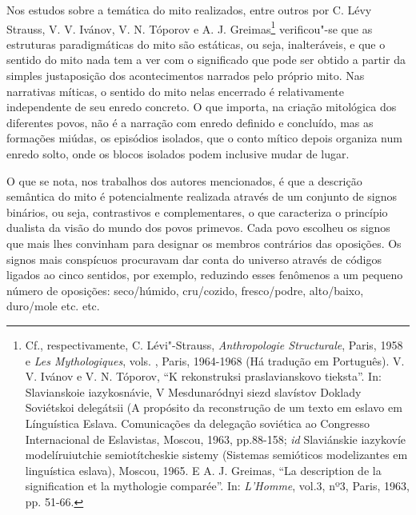 Nos estudos sobre a temática do mito realizados, entre outros por C.
Lévy Strauss, V. V. Ivánov, V. N. Tóporov e A. J. Greimas\footnote{Cf.,
  respectivamente, C. Lévi"-Strauss, \emph{Anthropologie Structurale}, Paris,
  1958 e \emph{Les Mythologiques}, vols. , Paris, 1964-1968 (Há tradução
  em Português). V. V. Ivánov e V. N. Tóporov, ``K rekonstruksi
  praslavianskovo tieksta''. In: Slavianskoie iazykosnávie, V
  Mesdunaródnyi siezd slavístov Doklady Soviétskoi delegátsii (A
  propósito da reconstrução de um texto em eslavo em Línguística Eslava.
  Comunicações da delegação soviética ao  Congresso Internacional de
  Eslavistas, Moscou, 1963, pp.88-158; \emph{id} Slaviánskie iazykovíe
  modelíruiutchie semiotítcheskie sistemy (Sistemas semióticos
  modelizantes em linguística eslava), Moscou, 1965. E A. J. Greimas,
  ``La description de la signification et la mythologie
  comparée''. In: \emph{L'Homme}, vol.3, nº3, Paris, 1963, pp. 51-66.}
verificou"-se que as estruturas paradigmáticas do mito são estáticas, ou
seja, inalteráveis, e que o sentido do mito nada tem a ver com o
significado que pode ser obtido a partir da simples justaposição dos
acontecimentos narrados pelo próprio mito. Nas narrativas míticas, o
sentido do mito nelas encerrado é relativamente independente de seu
enredo concreto. O que importa, na criação mitológica dos diferentes
povos, não é a narração com enredo definido e concluído, mas as
formações miúdas, os episódios isolados, que o conto mítico depois
organiza num enredo solto, onde os blocos isolados podem inclusive mudar
de lugar.

O que se nota, nos trabalhos dos autores mencionados, é que a
descrição semântica do mito é potencialmente realizada através de um
conjunto de signos binários, ou seja, contrastivos e complementares,
o que caracteriza o princípio dualista da visão do mundo dos povos
primevos. Cada povo escolheu os signos que mais lhes convinham para
designar os membros contrários das oposições. Os signos mais conspícuos
procuravam dar conta do universo através de códigos ligados ao cinco
sentidos, por exemplo, reduzindo esses fenômenos a um pequeno número de
oposições: seco/húmido, cru/cozido, fresco/podre, alto/baixo, duro/mole
etc. etc.


